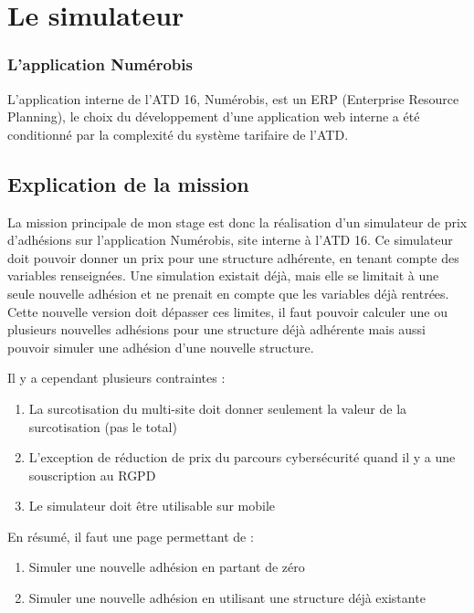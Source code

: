\documentclass[a4paper,12pt]{report}
\begin{document}
\section{Le simulateur}
\subsubsection{L'application Numérobis}
L'application interne de l'ATD 16, Numérobis, est un ERP (Enterprise Resource Planning), le choix du développement d'une application web interne a été conditionné par la complexité du système tarifaire de l'ATD.

\subsection{Explication de la mission}

La mission principale de mon stage est donc la réalisation d'un simulateur de prix d'adhésions sur l'application Numérobis, site interne à l'ATD 16. Ce simulateur doit pouvoir donner un prix pour une structure adhérente, en tenant compte des variables renseignées. Une simulation existait déjà, mais elle se limitait à une seule nouvelle adhésion et ne prenait en compte que les variables déjà rentrées. Cette nouvelle version doit dépasser ces limites, il faut pouvoir calculer une ou plusieurs nouvelles adhésions pour une structure déjà adhérente mais aussi pouvoir simuler une adhésion d'une nouvelle structure. 

Il y a cependant plusieurs contraintes :
\begin{enumerate}
    \item La surcotisation du multi-site doit donner seulement la valeur de la surcotisation (pas le total)
    \item L'exception de réduction de prix du parcours cybersécurité quand il y a une souscription au RGPD
    \item Le simulateur doit être utilisable sur mobile
\end{enumerate}

En résumé, il faut une page permettant de :
\begin{enumerate}
    \item Simuler une nouvelle adhésion en partant de zéro
    \item Simuler une nouvelle adhésion en utilisant une structure déjà existante
\end{enumerate}
\end{document}

